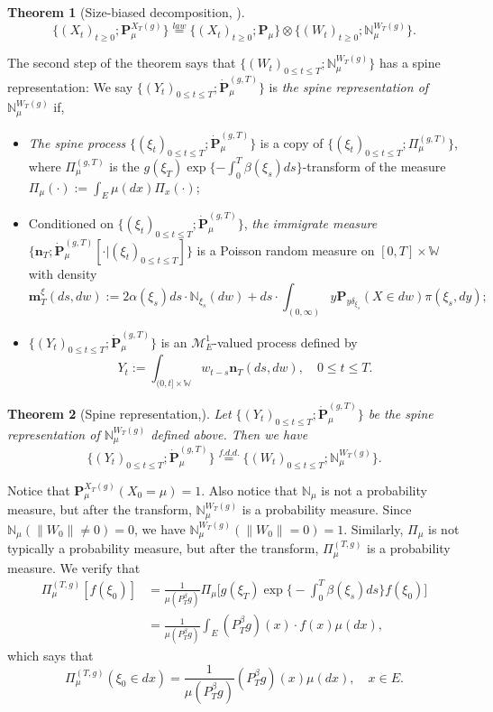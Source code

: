 \documentclass[12pt, a4paper]{amsart}
\newtheorem{thm}{Theorem}[section]
\theoremstyle{definition}
\numberwithin{equation}{section}
\begin{document}
\begin{thm}[Size-biased decomposition,  \cite{RenSongSun2017Spine}]\label{thm: size-biased decomposition}
\[
	\{(X_t)_{t\geq 0}; \mathbf P_\mu^{X_T(g)}\}
	\overset{law}{=} \{(X_t)_{t\geq 0}; \mathbf P_\mu \} \otimes \{(W_t)_{t\geq 0}; \mathbb N^{W_T(g)}_\mu\}.
\]
\end{thm}
	The second step of the theorem says that $\{(W_t)_{0\leq t\leq T}; \mathbb N^{W_T(g)}_\mu\}$ has a spine representation:
	We say $\{(Y_t)_{ 0\leq t\leq T}; \dot {\mathbf P}^{(g,T)}_\mu\}$ is \emph{the spine representation of $\mathbb N^{W_T(g)}_\mu$}  if,
\begin{itemize}
\item
	\emph{The spine process} $\{(\xi_t)_{0\leq t\leq T}; \dot{\mathbf P}^{(g,T)}_\mu\}$ is a copy of $\{(\xi_t)_{0\leq t\leq T}; \Pi^{(g,T)}_{\mu}\}$, where $\Pi^{(g,T)}_{\mu}$ is
	the $g(\xi_T) \exp\{-\int_0^T \beta(\xi_s)ds\}$-transform
	of the measure $\Pi_{\mu}(\cdot):=\int_{E}\mu(dx)\Pi_x(\cdot) $;
\item
	Conditioned on $\{(\xi_t)_{0\leq t\leq T}; \dot{\mathbf P}^{(g,T)}_\mu\}$, \emph{the immigrate measure} $\{\mathbf n_T; \dot{\mathbf P}^{(g,T)}_\mu[\cdot |(\xi_t)_{0\leq t\leq T}]\}$ is a Poisson random measure on $[0,T] \times \mathbb W$
	with density
\[
	\mathbf m^\xi_T(ds,dw)
	:= 2 \alpha(\xi_s) ds \cdot \mathbb N_{\xi_s}(dw) + ds \cdot \int_{(0,\infty)} y \mathbf P_{y\delta_{\xi_s}}(X\in dw) \pi(\xi_s,dy);
\]
\item
	$\{(Y_t)_{0\leq t\leq T}; \dot{\mathbf P}^{(g,T)}_\mu\}$ is an $\mathcal M^1_E$-valued process defined by
\[
	Y_t
	:= \int_{(0,t] \times \mathbb W} w_{t-s} \mathbf n_T(ds,dw),
	\quad 0 \leq t\leq T.
\]
\end{itemize}

\begin{thm}[Spine representation,\cite{RenSongSun2017Spine}]\label{thm: spine representation}
	Let $\{(Y_t)_{0\leq t\leq T}; \dot {\mathbf P}^{(g,T)}_\mu\}$ be the spine representation of $\mathbb N^{W_T(g)}_\mu$ defined above.
	Then we have
\[
	\{(Y_t)_{0\leq t\leq T}; \dot{\mathbf P}^{(g,T)}_\mu\}
	\overset{f.d.d.}{=} \{(W_t)_{0\leq t\leq T}; \mathbb N_\mu^{W_T(g)}\}.
\]
\end{thm}

    Notice that $\mathbf P^{X_T(g)}_\mu(X_0 = \mu) = 1$.
    Also notice that $\mathbb N_\mu$ is not a probability measure, but after the transform, $\mathbb N^{W_T(g)}_\mu$ is a probability measure.
	Since $\mathbb N_{\mu}(\|W_0\|\neq 0) = 0$, we have $\mathbb N_\mu^{W_T(g)}(\|W_0\|= 0) = 1$.
	Similarly, $\Pi_{\mu}$ is not typically a probability measure,
	but after the transform, $\Pi_{\mu}^{(T,g)}$ is a probability measure.
     We verify that
\[\begin{split}
	\Pi_{\mu}^{(T,g)} [ f(\xi_0) ]
	&= \frac{1}{\mu(P^\beta_Tg)}\Pi_{\mu}\Big[g(\xi_T) \exp\Big\{-\int_0^T \beta(\xi_s)ds \Big\} f(\xi_0) \Big]
	\\&= \frac{1}{\mu(P^\beta_T g)}
	\int_E (P^\beta_T g)(x) \cdot f(x)\mu(dx),
\end{split}\]
    which says that
\[\label{eq: initial distribution of spine}
	\Pi_{\mu}^{(T,g)} (\xi_0 \in dx)
	= \frac{1}{\mu(P^\beta_T g)} (P^\beta_T g)(x)\mu(dx),
	\quad x\in E.
\]
\end{document}
